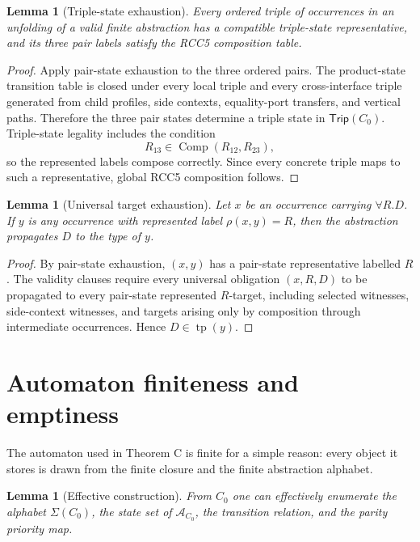 \documentclass[11pt]{article}
\newtheorem{lemma}[theorem]{Lemma}
\newcommand{\Comp}{\operatorname{Comp}}
\newcommand{\tp}{\operatorname{tp}}
\newcommand{\Aut}{\mathcal A}
\newcommand{\Trip}{\mathsf{Trip}}
\begin{document}
\begin{lemma}[Triple-state exhaustion]
Every ordered triple of occurrences in an unfolding of a valid finite abstraction has a compatible triple-state representative, and its three pair labels satisfy the RCC5 composition table.
\end{lemma}

\begin{proof}
Apply pair-state exhaustion to the three ordered pairs.  The product-state transition table is closed under every local triple and every cross-interface triple generated from child profiles, side contexts, equality-port transfers, and vertical paths.  Therefore the three pair states determine a triple state in $\Trip(C_0)$.  Triple-state legality includes the condition
\[
  R_{13}\in\Comp(R_{12},R_{23}),
\]
so the represented labels compose correctly.  Since every concrete triple maps to such a representative, global RCC5 composition follows.
\end{proof}

\begin{lemma}[Universal target exhaustion]
Let $x$ be an occurrence carrying $\forall R.D$.  If $y$ is any occurrence with represented label $\rho(x,y)=R$, then the abstraction propagates $D$ to the type of $y$.
\end{lemma}

\begin{proof}
By pair-state exhaustion, $(x,y)$ has a pair-state representative labelled $R$.  The validity clauses require every universal obligation $(x,R,D)$ to be propagated to every pair-state represented $R$-target, including selected witnesses, side-context witnesses, and targets arising only by composition through intermediate occurrences.  Hence $D\in\tp(y)$.
\end{proof}

\section{Automaton finiteness and emptiness}

The automaton used in Theorem C is finite for a simple reason: every object it stores is drawn from the finite closure and the finite abstraction alphabet.

\begin{lemma}[Effective construction]
From $C_0$ one can effectively enumerate the alphabet $\Sigma(C_0)$, the state set of $\Aut_{C_0}$, the transition relation, and the parity priority map.
\end{lemma}
\end{document}
